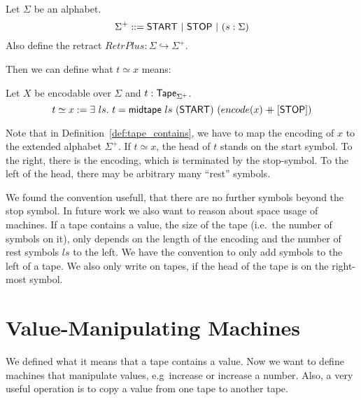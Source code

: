 \begin{definition}[$\Sigma^+$] Let $\Sigma$ be an alphabet.
  \[
    \Sigma^+ ::= \textsf{START} ~|~ \textsf{STOP} ~|~ (s: \Sigma)
  \]
  Also define the retract $RetrPlus : \Sigma \hookrightarrow \Sigma^+$.
\end{definition}

Then we can define what $t \simeq x$ means:

\begin{definition}[$t \simeq x$]
  \label{def:tape_contains}
  Let $X$ be encodable over $\Sigma$ and $t : \textsf{Tape}_{\Sigma^+}$.
  \[
    t \simeq x := \exists~ls.~
    t = \textsf{midtape}~ls~(\textsf{START})~(encode(x) \mathbin{+\mkern-10mu+} [\textsf{STOP}])
  \]
\end{definition}

Note that in Definition~\ref{def:tape_contains}, we have to map the encoding of $x$ to the extended alphabet $\Sigma^+$.  If $t \simeq x$, the head of
$t$ stands on the start symbol.  To the right, there is the encoding, which is terminated by the stop-symbol.  To the left of the head, there may be
arbitrary many ``rest'' symbols.

We found the convention usefull, that there are no further symbols beyond the stop symbol.  In future work we also want to reason about space usage of
machines.  If a tape contains a value, the size of the tape (i.e.\ the number of symbols on it), only depends on the length of the encoding and the
number of rest symbols $ls$ to the left.  We have the convention to only add symbols to the left of a tape.  We also only write on tapes, if the head
of the tape is on the right-most symbol.

\section{Value-Manipulating Machines}
\label{sec:value-manipulate}


We defined what it means that a tape contains a value.  Now we want to define machines that manipulate values, e.g\ increase or increase a number.
Also, a very useful operation is to copy a value from one tape to another tape.


\todo{}







